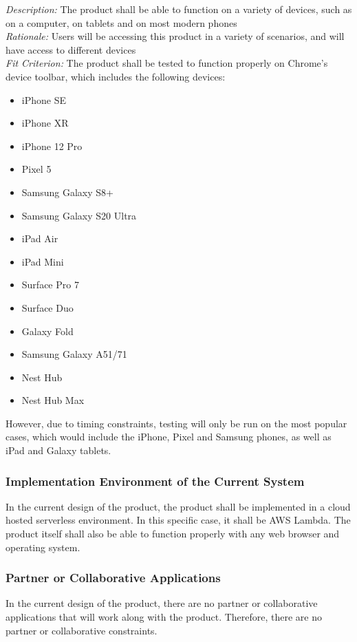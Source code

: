 \documentclass[12pt]{article}
\begin{document}
\emph{Description:} The product shall be able to function on a variety of devices, such as on a computer, on tablets and on most modern phones\\
\emph{Rationale:} Users will be accessing this product in a variety of scenarios, and will have access to different devices\\
\emph{Fit Criterion:} The product shall be tested to function properly on Chrome's device toolbar, which includes the following devices:
\begin{itemize}
	\item iPhone SE
	\item iPhone XR
	\item iPhone 12 Pro
	\item Pixel 5
	\item Samsung Galaxy S8+
	\item Samsung Galaxy S20 Ultra
	\item iPad Air
	\item iPad Mini
	\item Surface Pro 7
	\item Surface Duo
	\item Galaxy Fold
	\item Samsung Galaxy A51/71
	\item Nest Hub
	\item Nest Hub Max
\end{itemize}
However, due to timing constraints, testing will only be run on the most popular cases, which would include the iPhone, Pixel and Samsung phones, as well as iPad and Galaxy tablets.

\subsubsection{Implementation Environment of the Current System}
In the current design of the product, the product shall be implemented in a cloud hosted serverless
environment. In this specific case, it shall be AWS Lambda. The product itself shall also be able
to function properly with any web browser and operating system.

\subsubsection{Partner or Collaborative Applications}
In the current design of the product, there are no partner or collaborative applications that will
work along with the product. Therefore, there are no partner or collaborative constraints.
\end{document}
